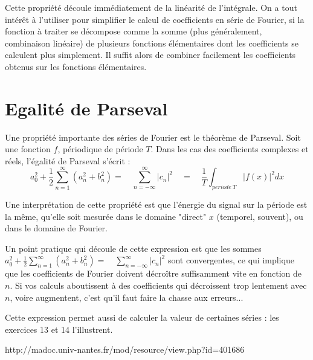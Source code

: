Cette propriété découle immédiatement de la linéarité de l'intégrale. On a tout intérêt à l'utiliser pour simplifier le calcul de coefficients en série de Fourier,  si la fonction à traiter se décompose comme la somme (plus généralement, combinaison linéaire) de plusieurs fonctions élémentaires dont les coefficients se calculent plus simplement. Il suffit alors de combiner facilement les coefficients obtenus sur les fonctions élémentaires.

\section{Egalité de Parseval}

Une propriété importante des séries de Fourier est le théorème de
Parseval. Soit une fonction $f$, périodique de période $T$. Dans les cas des coefficients complexes et réels, l'égalité de Parseval s'écrit :
\begin{equation}
a_0^2+\frac{1}{2}\sum_{n=1}^\infty (a_n^2+b_n^2)=\quad \sum_{n=-\infty}^\infty | c_n|^2 \quad=\quad \frac{1}{T}\int_{periode~T}|f(x)|^2 dx
\end{equation}

Une interprétation de cette propriété est que l'énergie du signal sur la période est la même, qu'elle soit mesurée dans le domaine "direct" $x$ (temporel, souvent), ou dans le domaine de Fourier. 

Un point pratique qui découle de cette expression est que les sommes $a_0^2 + \frac{1}{2}\sum_{n=1}^\infty (a_n^2+b_n^2)=\quad\sum_{n=-\infty}^\infty | c_n|^2 $ sont convergentes, ce qui implique que les coefficients de Fourier doivent décroître suffisamment vite en fonction de $n$. Si vos calculs aboutissent à des coefficients qui décroissent trop lentement avec $n$, voire augmentent, c'est qu'il faut faire la chasse aux erreurs...

Cette expression permet aussi de calculer la valeur de certaines séries : les exercices 13 et 14 l'illustrent.


http://madoc.univ-nantes.fr/mod/resource/view.php?id=401686


